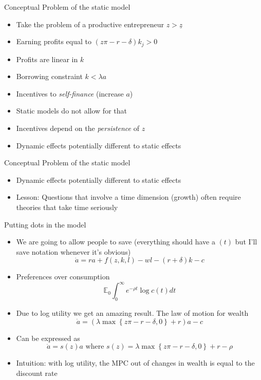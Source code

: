 \documentclass[11pt,aspectratio=169,xcolor={dvipsnames},hyperref={pdftex,pdfpagemode=UseNone,hidelinks,pdfdisplaydoctitle=true},usepdftitle=false]{beamer}
\begin{document}
\begin{frame}{Conceptual Problem of the static model}
\begin{itemize}
\item Take the problem of a productive entrepreneur $z> \underline{z}$
\item Earning profits equal to $(z \pi - r - \delta)k_j > 0$
\item Profits are linear in $k$
\item Borrowing constraint $k < \lambda a$
\item Incentives to \textit{self-finance} (increase $a$)
\item Static models do not allow for that
\item Incentives depend on the \textit{persistence} of $z$
\item Dynamic effects potentially different to static effects
\end{itemize}
\end{frame}

\begin{frame}{Conceptual Problem of the static model}
\begin{itemize}
\item Dynamic effects potentially different to static effects
\item Lesson:  Questions that involve a time dimension (growth) often require theories that take time seriously
\end{itemize}
\end{frame}

\begin{frame}{Putting dots in the model}
\begin{itemize}
\item We are going to allow people to save (everything should have a $(t)$ but I'll save notation whenever it's obvious)
\[\dot{a} = r a + f(z,k,l) - wl - (r+\delta) k - c \]
\item Preferences over consumption
\[\mathbb{E}_0 \int_0^{\infty} e^{-\rho t} \log c(t) dt\]
\item Due to log utility we get an amazing result. The law of motion for wealth
\[\dot{a} = (\lambda \max \left\lbrace z\pi - r - \delta,0\right\rbrace + r) a - c\]
\item Can be expressed as
\[\dot{a} = s(z) a \text{  where  } s(z) =  \lambda \max \left\lbrace z\pi - r - \delta,0 \right\rbrace+ r - \rho\]
\item Intuition: with log utility, the MPC out of changes in wealth is equal to the discount rate
\end{itemize}
\end{frame}
\end{document}
